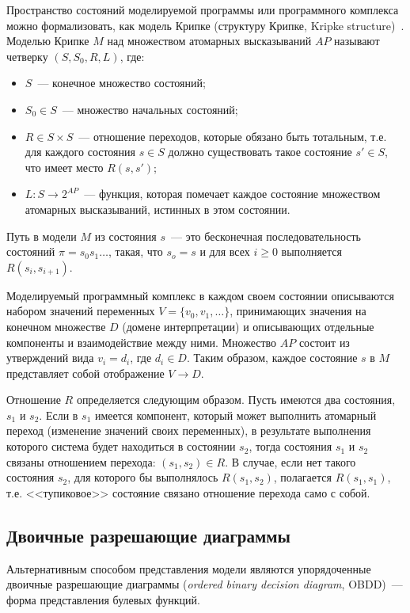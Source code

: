 \documentclass[a4paper,notitlepage,14pt]{article}
\begin{document}
Пространство состояний моделируемой программы или программного комплекса можно
формализовать, как модель Крипке (структуру Крипке, Kripke
structure)~\cite{Clarke}. Моделью Крипке $M$ над множеством атомарных высказываний $AP$
называют четверку $(S, S_0, R, L)$, где:

\begin{itemize}
\item $S$~--- конечное множество состояний;
\item $S_0 \in S$~--- множество начальных состояний;
\item $R \in S \times S$~--- отношение переходов, которые обязано быть тотальным, т.е. для
  каждого состояния $s \in S$ должно существовать такое состояние $s' \in S$, что имеет
  место $R(s, s')$;
\item $L\colon S \rightarrow 2^{AP}$~--- функция, которая помечает каждое состояние
  множеством атомарных высказываний, истинных в этом состоянии.
\end{itemize}

Путь в модели $M$ из состояния $s$~--- это бесконечная последовательность состояний $\pi =
s_0 s_1 \ldots$, такая, что $s_o = s$ и для всех $i \geq 0$ выполняется $R(s_i, s_{i+1})$.

Моделируемый программный комплекс в каждом своем состоянии описываются набором значений
переменных $V = \{v_0, v_1, \ldots\}$, принимающих значения на конечном множестве $D$
(домене интерпретации) и описывающих отдельные компоненты и взаимодействие между
ними. Множество $AP$ состоит из утверждений вида $v_i = d_i$, где $d_i \in D$. Таким
образом, каждое состояние $s$ в $M$ представляет собой отображение $V \rightarrow D$.

Отношение $R$ определяется следующим образом. Пусть имеются два состояния, $s_1$ и
$s_2$. Если в $s_1$ имеется компонент, который может выполнить атомарный переход
(изменение значений своих переменных), в результате выполнения которого система будет
находиться в состоянии $s_2$, тогда состояния $s_1$ и $s_2$ связаны отношением перехода:
$(s_1, s_2) \in R$. В случае, если нет такого состояния $s_2$, для которого бы выполнялось
$R(s_1, s_2)$, полагается $R(s_1, s_1)$, т.е. <<тупиковое>> состояние связано отношение
перехода само с собой.

\subsection{Двоичные разрешающие диаграммы}
\label{sec:obdd}

Альтернативным способом представления модели являются упорядоченные двоичные разрешающие
диаграммы (\emph{ordered binary decision diagram}, OBDD)\cite{Clarke}~--- форма
представления булевых функций. 
\end{document}
